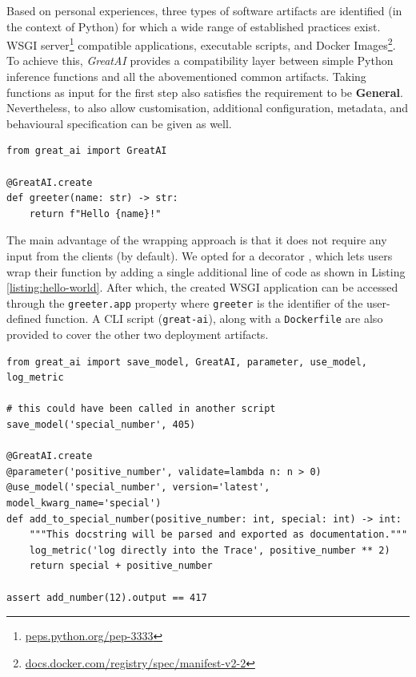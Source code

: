 Based on personal experiences, three types of software artifacts are identified (in the context of Python) for which a wide range of established practices exist. WSGI server\footnote{\href{https://peps.python.org/pep-3333/}{peps.python.org/pep-3333}} compatible applications, executable scripts, and Docker Images\footnote{\href{https://docs.docker.com/registry/spec/manifest-v2-2/}{docs.docker.com/registry/spec/manifest-v2-2}}. To achieve this, \textit{GreatAI} provides a compatibility layer between simple Python inference functions and all the abovementioned common artifacts. Taking functions as input for the first step also satisfies the requirement to be \textbf{General}. Nevertheless, to also allow customisation, additional configuration, metadata, and behavioural specification can be given as well.

\begin{listing}[h]
\begin{verbatim}
from great_ai import GreatAI

@GreatAI.create
def greeter(name: str) -> str:
    return f"Hello {name}!"
\end{verbatim}
\captionsetup{width=.9\linewidth}
\caption{Simplest example using \textit{GreatAI} for wrapping a function. In practice, \texttt{greeter} could be the inference function of an ML model.}
\label{listing:hello-world}
\end{listing}

The main advantage of the wrapping approach is that it does not require any input from the clients (by default). We opted for a decorator \cite{gamma1995design}, which lets users wrap their function by adding a single additional line of code as shown in Listing \ref{listing:hello-world}. After which, the created WSGI application can be accessed through the \texttt{greeter.app} property where \texttt{greeter} is the identifier of the user-defined function. A CLI script (\texttt{great-ai}), along with a \texttt{Dockerfile} are also provided to cover the other two deployment artifacts.

\begin{listing}[h]
\begin{verbatim}
from great_ai import save_model, GreatAI, parameter, use_model, log_metric

# this could have been called in another script
save_model('special_number', 405)

@GreatAI.create
@parameter('positive_number', validate=lambda n: n > 0)
@use_model('special_number', version='latest', model_kwarg_name='special')
def add_to_special_number(positive_number: int, special: int) -> int:
    """This docstring will be parsed and exported as documentation."""
    log_metric('log directly into the Trace', positive_number ** 2)
    return special + positive_number

assert add_number(12).output == 417
\end{verbatim}
\captionsetup{width=.9\linewidth,position=top,skip=-20pt}
\caption{A simple \textit{GreatAI} service with behavioural customisations.}
\label{listing:complex}
\end{listing}

